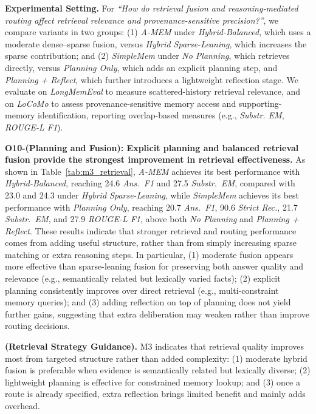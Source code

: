\documentclass{llmxive}
\begin{document}
\noindent \textbf{Experimental Setting.}
For \textit{``How do retrieval fusion and reasoning-mediated routing affect retrieval relevance and provenance-sensitive precision?''}, we compare variants in two groups:
(1) \textit{A-MEM} under \textit{Hybrid-Balanced}, which uses a moderate dense--sparse fusion, versus \textit{Hybrid Sparse-Leaning}, which increases the sparse contribution; and (2) \textit{SimpleMem} under \textit{No Planning}, which retrieves directly, versus \textit{Planning Only}, which adds an explicit planning step, and \textit{Planning + Reflect}, which further introduces a lightweight reflection stage.
We evaluate on \textit{LongMemEval} to measure scattered-history retrieval relevance, and on \textit{LoCoMo} to assess provenance-sensitive memory access and supporting-memory identification, reporting overlap-based measures (e.g., \textit{Substr. EM}, \textit{ROUGE-L F1}).

\noindent \textbf{O10-(Planning and Fusion): Explicit planning and balanced retrieval fusion provide the strongest improvement in retrieval effectiveness.}
As shown in Table~\ref{tab:m3_retrieval}, \textit{A-MEM} achieves its best performance with \textit{Hybrid-Balanced}, reaching 24.6 \textit{Ans.\ F1} and 27.5 \textit{Substr.\ EM}, compared with 23.0 and 24.3 under \textit{Hybrid Sparse-Leaning}, while \textit{SimpleMem} achieves its best performance with \textit{Planning Only}, reaching 20.7 \textit{Ans.\ F1}, 90.6 \textit{Strict Rec.}, 21.7 \textit{Substr.\ EM}, and 27.9 \textit{ROUGE-L F1}, above both \textit{No Planning} and \textit{Planning + Reflect}.
These results indicate that stronger retrieval and routing performance comes from adding useful structure, rather than from simply increasing sparse matching or extra reasoning steps.
In particular, (1) moderate fusion appears more effective than sparse-leaning fusion for preserving both answer quality and relevance (e.g., semantically related but lexically varied facts); (2) explicit planning consistently improves over direct retrieval (e.g., multi-constraint memory queries); and (3) adding reflection on top of planning does not yield further gains, suggesting that extra deliberation may weaken rather than improve routing decisions.

\begin{findingbox}
\textbf{(Retrieval Strategy Guidance).}
M3 indicates that retrieval quality improves most from targeted structure rather than added complexity:
(1) moderate hybrid fusion is preferable when evidence is semantically related but lexically diverse;
(2) lightweight planning is effective for constrained memory lookup;
and (3) once a route is already specified, extra reflection brings limited benefit and mainly adds overhead.
\end{findingbox}
\end{document}
